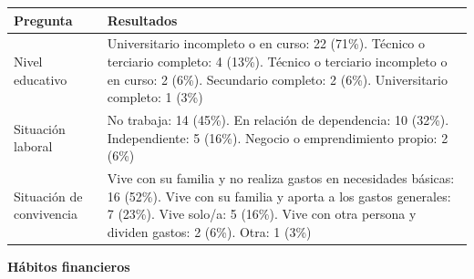 {\def\LTcaptype{none} %
\begin{longtable}[]{@{}
  >{\raggedright\arraybackslash}p{}
  >{\raggedright\arraybackslash}p{}@{}}
\toprule\noalign{}
\begin{minipage}[b]{\linewidth}\raggedright
Pregunta
\end{minipage} & \begin{minipage}[b]{\linewidth}\raggedright
Resultados
\end{minipage} \\
\midrule\noalign{}
\endhead
\bottomrule\noalign{}
\endlastfoot
Nivel educativo & Universitario incompleto o en curso: 22 (71\%).
Técnico o terciario completo: 4 (13\%). Técnico o terciario incompleto o
en curso: 2 (6\%). Secundario completo: 2 (6\%). Universitario completo:
1 (3\%) \\
Situación laboral & No trabaja: 14 (45\%). En relación de dependencia:
10 (32\%). Independiente: 5 (16\%). Negocio o emprendimiento propio: 2
(6\%) \\
Situación de convivencia & Vive con su familia y no realiza gastos en
necesidades básicas: 16 (52\%). Vive con su familia y aporta a los
gastos generales: 7 (23\%). Vive solo/a: 5 (16\%). Vive con otra persona
y dividen gastos: 2 (6\%). Otra: 1 (3\%) \\
\end{longtable}
}

\textbf{Hábitos financieros}

